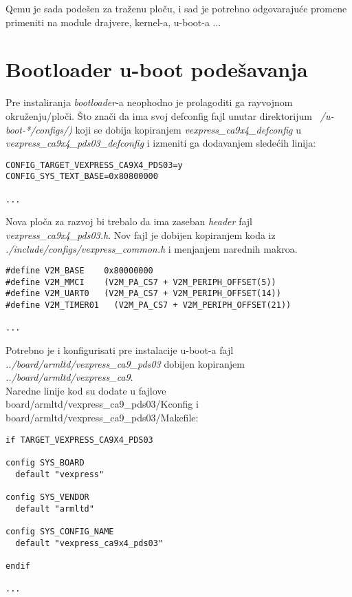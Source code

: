 \documentclass{article}
\begin{document}
Qemu je sada podešen za traženu ploču, i sad je potrebno odgovarajuće promene primeniti na module drajvere, kernel-a, u-boot-a ...

\section{Bootloader u-boot podešavanja} 

Pre instaliranja \textit{bootloader}-a neophodno je prolagoditi ga rayvojnom okruženju/ploči. Što znači da ima svoj defconfig fajl unutar direktorijum \textit{~/u-boot-*/configs/)} koji se dobija kopiranjem \textit{vexpress\_ca9x4\_defconfig} u \textit{vexpress\_ca9x4\_pds03\_defconfig} i izmeniti ga dodavanjem sledećih linija:

\begin{file}
\begin{verbatim}
CONFIG_TARGET_VEXPRESS_CA9X4_PDS03=y
CONFIG_SYS_TEXT_BASE=0x80800000

...
\end{verbatim}
\end{file}

Nova ploča za razvoj bi trebalo da ima zaseban \textit{header} fajl \textit{vexpress\_ca9x4\_pds03.h}. Nov fajl je dobijen kopiranjem koda iz \textit{./include/configs/vexpress\_common.h} i menjanjem narednih makroa.

\begin{file}
\begin{verbatim}
#define V2M_BASE    0x80000000
#define V2M_MMCI    (V2M_PA_CS7 + V2M_PERIPH_OFFSET(5))
#define V2M_UART0   (V2M_PA_CS7 + V2M_PERIPH_OFFSET(14))
#define V2M_TIMER01   (V2M_PA_CS7 + V2M_PERIPH_OFFSET(21))

...
\end{verbatim}
\end{file}

Potrebno je i konfigurisati pre instalacije u-boot-a fajl \textit{../board/armltd/vexpress\_ca9\_pds03} dobijen kopiranjem \textit{../board/armltd/vexpress\_ca9}. \\

Naredne linije kod su dodate u fajlove board/armltd/vexpress\_ca9\_pds03/Kconfig i board/armltd/vexpress\_ca9\_pds03/Makefile:

\begin{file}
\begin{verbatim}
if TARGET_VEXPRESS_CA9X4_PDS03

config SYS_BOARD
  default "vexpress"

config SYS_VENDOR
  default "armltd"

config SYS_CONFIG_NAME
  default "vexpress_ca9x4_pds03"

endif

...
\end{verbatim}
\end{file}
\end{document}
